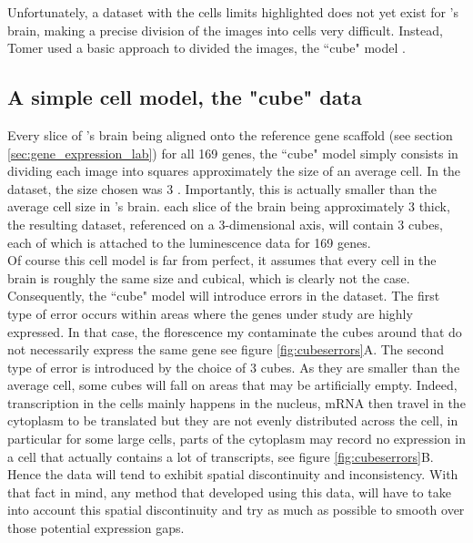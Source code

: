   Unfortunately, a dataset with the cells limits highlighted does not yet exist for \platy{}'s brain, making a precise division of the images into cells very difficult. Instead, Tomer used a basic approach to divided the images, the ``cube" model \cite{Tomer10}.


  \subsection{A simple cell model, the "cube" data}
  
  Every slice of \platy{}'s brain being aligned onto the reference gene scaffold (see section \ref{sec:gene_expression_lab}) for all 169 genes, the ``cube" model simply consists in dividing each image into squares approximately the size of an average cell. In the \platy{} dataset, the size chosen was 3 . Importantly, this is actually smaller than the average cell size in \platy{}'s brain. each slice of the brain being approximately 3 \microm{} thick, the resulting dataset, referenced on a 3-dimensional axis, will contain 3  cubes, each of which is attached to the luminescence data for 169 genes.\\
  
  Of course this cell model is far from perfect, it assumes that every cell in the brain is roughly the same size and cubical, which is clearly not the case. Consequently, the ``cube" model will introduce errors in the dataset. The first type of error occurs within areas where the genes under study are highly expressed. In that case, the florescence my contaminate the cubes around that do not necessarily express the same gene see figure \ref{fig:cubeserrors}A. The second type of error is introduced by the choice of 3  cubes. As they are smaller than the average cell, some cubes will fall on areas that may be artificially empty. Indeed, transcription in the cells mainly happens in the nucleus, mRNA then travel in the cytoplasm to be translated but they are not evenly distributed across the cell, in particular for some large cells, parts of the cytoplasm may record no expression in a cell that actually contains a lot of transcripts, see figure \ref{fig:cubeserrors}B.\\
  
  Hence the data will tend to exhibit spatial discontinuity and inconsistency. With that fact in mind, any method that developed using this data, will have to take into account this spatial discontinuity and try as much as possible to smooth over those potential expression gaps.\\
  
